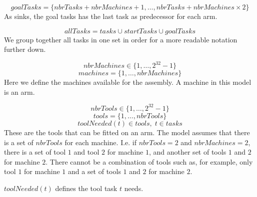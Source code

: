 \documentclass[10pt,a4paper]{report}
\begin{document}
\begin{equation}\label{eq:20}
goalTasks = \{nbrTasks+nbrMachines+1 , \ldots , nbrTasks+nbrMachines \times 2\}\end{equation}
As sinks, the goal tasks has the last task as predecessor for each arm.

\begin{equation}\label{eq:21}
allTasks = tasks \cup startTasks \cup goalTasks
\end{equation}
We group together all tasks in one set in order for a more readable notation further down.

\begin{equation}\label{eq:2}
nbrMachines \in \{1 , \ldots , 2^{32}-1\}
\end{equation}
\begin{equation}\label{eq:11}
machines = \{1 , \ldots , nbrMachines\}
\end{equation}
Here we define the machines available for the assembly. A machine in this model is an arm.

\begin{equation}\label{eq:3}
nbrTools \in \{1 , \ldots , 2^{32}-1\}
\end{equation}
\begin{equation}\label{eq:12}
tools = \{1 , \ldots , nbrTools\}
\end{equation}
\begin{equation}\label{eq:33}
toolNeeded(t) \in tools, \; t \in tasks
\end{equation} 
These are the tools that can be fitted on an arm. The model assumes that there is a set of $nbrTools$ for each machine. I.e. if $nbrTools = 2$ and $nbrMachines = 2$, there is a set of tool $1$ and tool $2$ for machine $1$, and another set of tools $1$ and $2$ for machine $2$. There cannot be a combination of tools such as, for example, only tool $1$ for machine $1$ and a set of tools $1$ and $2$ for machine $2$.

$toolNeeded(t)$ defines the tool task $t$ needs.
\end{document}

